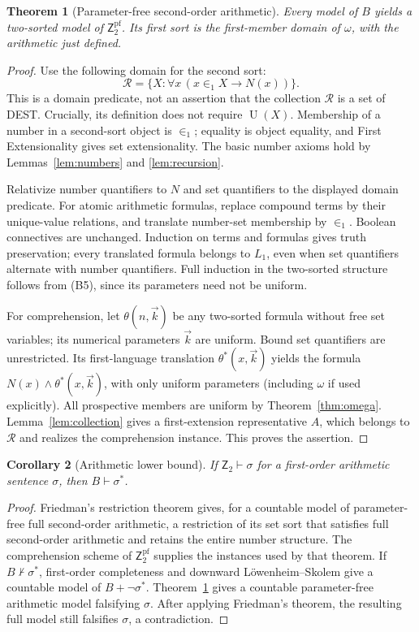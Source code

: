 \documentclass[11pt,a4paper]{article}
\numberwithin{equation}{section}
\newtheorem{theorem}{Theorem}[section]
\newtheorem{corollary}[theorem]{Corollary}
\theoremstyle{definition}
\theoremstyle{remark}
\newcommand{\Ztwo}{\mathsf{Z}_2}
\newcommand{\Unif}{\operatorname{U}}
\newcommand{\extone}{\in_1}
\begin{document}
\begin{theorem}[Parameter-free second-order arithmetic]\label{thm:pf}
Every model of $B$ yields a two-sorted model of $\Ztwo^{\mathrm{pf}}$. Its first sort is the first-member domain of $\omega$, with the arithmetic just defined.
\end{theorem}
\begin{proof}
Use the following domain for the second sort:
\[\mathcal R=\{X:\forall x\,(x\extone X\to N(x))\}.\]
This is a domain predicate, not an assertion that the collection $\mathcal R$ is a set of DEST. Crucially, its definition does not require $\Unif(X)$. Membership of a number in a second-sort object is $\extone$; equality is object equality, and First Extensionality gives set extensionality. The basic number axioms hold by Lemmas~\ref{lem:numbers} and \ref{lem:recursion}.

Relativize number quantifiers to $N$ and set quantifiers to the displayed domain predicate. For atomic arithmetic formulas, replace compound terms by their unique-value relations, and translate number-set membership by $\extone$. Boolean connectives are unchanged. Induction on terms and formulas gives truth preservation; every translated formula belongs to $L_1$, even when set quantifiers alternate with number quantifiers. Full induction in the two-sorted structure follows from (B5), since its parameters need not be uniform.

For comprehension, let $\theta(n,\vec k)$ be any two-sorted formula without free set variables; its numerical parameters $\vec k$ are uniform. Bound set quantifiers are unrestricted. Its first-language translation $\theta^*(x,\vec k)$ yields the formula $N(x)\land\theta^*(x,\vec k)$, with only uniform parameters (including $\omega$ if used explicitly). All prospective members are uniform by Theorem~\ref{thm:omega}. Lemma~\ref{lem:collection} gives a first-extension representative $A$, which belongs to $\mathcal R$ and realizes the comprehension instance. This proves the assertion.
\end{proof}
\begin{corollary}[Arithmetic lower bound]\label{cor:lower}
If $\Ztwo\vdash\sigma$ for a first-order arithmetic sentence $\sigma$, then $B\vdash\sigma^*$.
\end{corollary}
\begin{proof}
Friedman's restriction theorem \cite[Lemma 3.1.7]{friedman} gives, for a countable model of parameter-free full second-order arithmetic, a restriction of its set sort that satisfies full second-order arithmetic and retains the entire number structure. The comprehension scheme of $\Ztwo^{\mathrm{pf}}$ supplies the instances used by that theorem. If $B\nvdash\sigma^*$, first-order completeness and downward L\"owenheim--Skolem give a countable model of $B+\neg\sigma^*$. Theorem~\ref{thm:pf} gives a countable parameter-free arithmetic model falsifying $\sigma$. After applying Friedman's theorem, the resulting full model still falsifies $\sigma$, a contradiction.
\end{proof}
\end{document}
